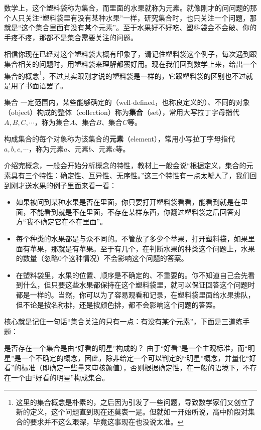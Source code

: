 数学上，这个塑料袋称为集合，而里面的水果就称为元素。就像刚才的问问题的那个人只关注“塑料袋里有没有某种水果”一样，研究集合时，也只关注一个问题，那就是“这个集合里面有没有某个元素”。至于水果好不好吃、塑料袋会不会破、你的手疼不疼，那都不是集合需要关注的问题。

相信你现在已经对这个塑料袋大概有印象了，请记住塑料袋这个例子，每次遇到跟集合相关的问题时，用塑料袋来理解都蛮好用。现在我们回到数学上来，给出一个集合的概念\footnote{这里的集合概念是朴素的，之后因为引发了一些问题，导致数学家们又创立了新的定义，这个问题直到现在还莫衷一是。但就如一开始所说，高中阶段对集合的要求并不这么艰深，毕竟这事现在也没说太准。}，不过其实跟刚才说的塑料袋是一样的，它跟塑料袋的区别也不过就是用了书面语罢了。

\begin{definition}{集合}
一定范围内，某些能够确定的（well-defined，也称良定义的）、不同的对象（object）构成的整体（collection）称为\textbf{集合}（set），常用大写拉丁字母指代$A,B,C,\cdots$，称为集合$A$、集合$B$、集合$C$等。

构成集合的每个对象称为该集合的\textbf{元素}（element），常用小写拉丁字母指代$a,b,c,\cdots$，称为元素$a$、元素$b$、元素$c$等。
\end{definition}

介绍完概念，一般会开始分析概念的特性，教材上一般会说“根据定义，集合的元素具有三个特性：确定性、互异性、无序性。”这三个特性有一点太唬人了，我们回到刚才送水果的例子里面来看一看：

\begin{itemize}
\item 如果被问到某种水果是否在里面，你只要打开塑料袋看看，能看到就是在里面，不能看到就是不在里面，不存在某样东西，你翻过塑料袋之后回答对方“我不确定它在不在里面”。
\item 每个种类的水果都是与众不同的。不管放了多少个苹果，打开塑料袋，如果里面有苹果，那就是有苹果。至于有几个，在判断水果的种类这个问题上，水果的数量（忽略0个这种情况）不会影响这个问题的答案。
\item 在塑料袋里，水果的位置、顺序是不确定的、不重要的。你不知道自己会先看到什么，但只要这些水果都保持在这个塑料袋里，就可以保证回答这个问题时都是一样的。当然，你可以为了容易观看和记录，在塑料袋里面给水果排队，但不论是按名称排，还是按颜色排，都不会影响这个问题的答案。
\end{itemize}

核心就是记住一句话“集合关注的只有一点：有没有某个元素”，下面是三道练手题：

\begin{example}{是否存在一个集合是由“好看的明星”构成的？}
由于“好看”是一个主观标准，而“明星”是一个不确定的概念，因此，除非给定一个可以判定的“明星”概念，并量化“好看”的标准（即确定一些量来审核颜值），否则根据确定性，在一般的语境下，不存在一个由“好看的明星”构成集合。
\end{example}

